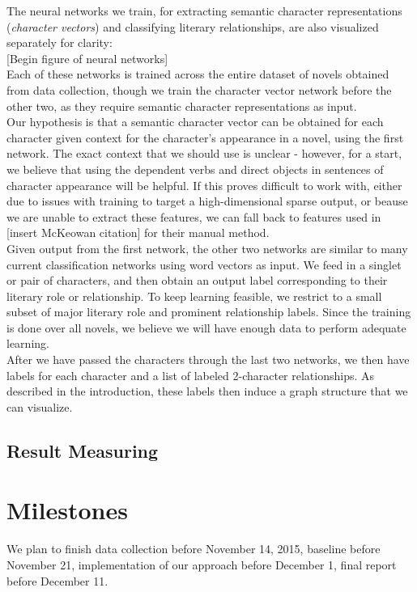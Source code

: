 \documentclass[dvips,12pt]{article}
\begin{document}
    The neural networks we train, for extracting semantic character representations (\emph{character vectors}) and classifying literary relationships, are also visualized separately for clarity: \\

    [Begin figure of neural networks] \\

    Each of these networks is trained across the entire dataset of novels obtained from data collection, though we train the character vector network before the other two, as they require semantic character representations as input.  \\

    Our hypothesis is that a semantic character vector can be obtained for each character given context for the character's appearance in a novel, using the first network. The exact context that we should use is unclear - however, for a start, we believe that using the dependent verbs and direct objects in sentences of character appearance will be helpful. If this proves difficult to work with, either due to issues with training to target a high-dimensional sparse output, or beause we are unable to extract these features, we can fall back to features used in [insert McKeowan citation] for their manual method. \\

    Given output from the first network, the other two networks are similar to many current classification networks using word vectors as input. We feed in a singlet or pair of characters, and then obtain an output label corresponding to their literary role or relationship. To keep learning feasible, we restrict to a small subset of major literary role and prominent relationship labels. Since the training is done over all novels, we believe we will have enough data to perform adequate learning. \\

    After we have passed the characters through the last two networks, we then have labels for each character and a list of labeled 2-character relationships. As described in the introduction, these labels then induce a graph structure that we can visualize.

\subsection{Result Measuring}
\section{Milestones}
    We plan to finish data collection before November 14, 2015, baseline before November 21, implementation of our approach before December 1, final report before December 11.
\end{document}
